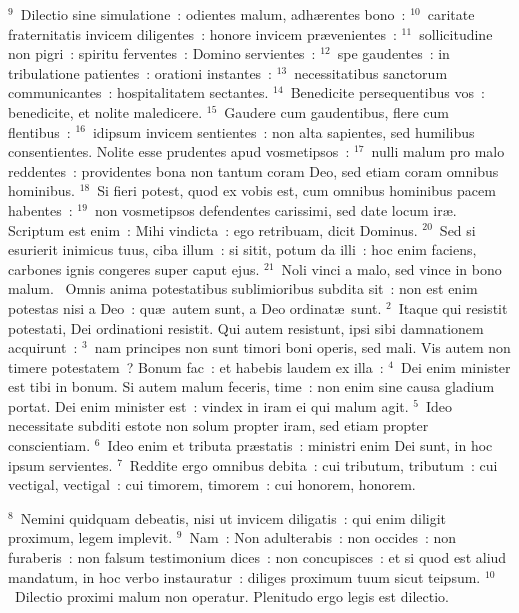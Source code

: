 ${}^{9}$~Dilectio sine simulatione~: odientes malum, adh\ae rentes bono~:
${}^{10}$~caritate fraternitatis invicem diligentes~: honore invicem pr\ae venientes~:
${}^{11}$~sollicitudine non pigri~: spiritu ferventes~: Domino servientes~:
${}^{12}$~spe gaudentes~: in tribulatione patientes~: orationi instantes~:
${}^{13}$~necessitatibus sanctorum communicantes~: hospitalitatem sectantes.
${}^{14}$~Benedicite persequentibus vos~: benedicite, et nolite maledicere.
${}^{15}$~Gaudere cum gaudentibus, flere cum flentibus~:
${}^{16}$~idipsum invicem sentientes~: non alta sapientes, sed humilibus consentientes. Nolite esse prudentes apud vosmetipsos~:
${}^{17}$~nulli malum pro malo reddentes~: providentes bona non tantum coram Deo, sed etiam coram omnibus hominibus.
${}^{18}$~Si fieri potest, quod ex vobis est, cum omnibus hominibus pacem habentes~:
${}^{19}$~non vosmetipsos defendentes carissimi, sed date locum ir\ae . Scriptum est enim~: Mihi vindicta~: ego retribuam, dicit Dominus.
${}^{20}$~Sed si esurierit inimicus tuus, ciba illum~: si sitit, potum da illi~: hoc enim faciens, carbones ignis congeres super caput ejus.
${}^{21}$~Noli vinci a malo, sed vince in bono malum.
~Omnis anima potestatibus sublimioribus subdita sit~: non est enim potestas nisi a Deo~: qu\ae\ autem sunt, a Deo ordinat\ae\ sunt.
${}^{2}$~Itaque qui resistit potestati, Dei ordinationi resistit. Qui autem resistunt, ipsi sibi damnationem acquirunt~:
${}^{3}$~nam principes non sunt timori boni operis, sed mali. Vis autem non timere potestatem~? Bonum fac~: et habebis laudem ex illa~:
${}^{4}$~Dei enim minister est tibi in bonum. Si autem malum feceris, time~: non enim sine causa gladium portat. Dei enim minister est~: vindex in iram ei qui malum agit.
${}^{5}$~Ideo necessitate subditi estote non solum propter iram, sed etiam propter conscientiam.
${}^{6}$~Ideo enim et tributa pr\ae statis~: ministri enim Dei sunt, in hoc ipsum servientes.
${}^{7}$~Reddite ergo omnibus debita~: cui tributum, tributum~: cui vectigal, vectigal~: cui timorem, timorem~: cui honorem, honorem.


${}^{8}$~Nemini quidquam debeatis, nisi ut invicem diligatis~: qui enim diligit proximum, legem implevit.
${}^{9}$~Nam~: Non adulterabis~: non occides~: non furaberis~: non falsum testimonium dices~: non concupisces~: et si quod est aliud mandatum, in hoc verbo instauratur~: diliges proximum tuum sicut teipsum.
${}^{10}$~Dilectio proximi malum non operatur. Plenitudo ergo legis est dilectio.


